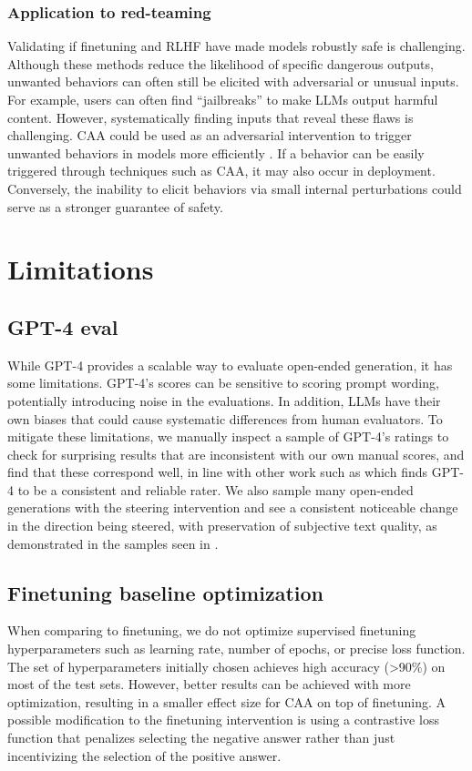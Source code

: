 \documentclass[11pt]{article}
\begin{document}
\subsubsection*{Application to red-teaming}
Validating if finetuning and RLHF have made models robustly safe is challenging. Although these methods reduce the likelihood of specific dangerous outputs, unwanted behaviors can often still be elicited with adversarial or unusual inputs. For example, users can often find ``jailbreaks'' to make LLMs output harmful content. However, systematically finding inputs that reveal these flaws is challenging. 
CAA could be used as an adversarial intervention to trigger unwanted behaviors in models more efficiently \citep{ninaredteaming}. If a behavior can be easily triggered through techniques such as CAA, it may also occur in deployment. Conversely, the inability to elicit behaviors via small internal perturbations could serve as a stronger guarantee of safety.

\clearpage

\section{Limitations}

\subsection*{GPT-4 eval}
While GPT-4 provides a scalable way to evaluate open-ended generation, it has some limitations. GPT-4's scores can be sensitive to scoring prompt wording, potentially introducing noise in the evaluations. In addition, LLMs have their own biases that could cause systematic differences from human evaluators. To mitigate these limitations, we manually inspect a sample of GPT-4's ratings to check for surprising results that are inconsistent with our own manual scores, and find that these correspond well, in line with other work such as \citet{Hackl_2023} which finds GPT-4 to be a consistent and reliable rater. We also sample many open-ended generations with the steering intervention and see a consistent noticeable change in the direction being steered, with preservation of subjective text quality, as demonstrated in the samples seen in .


\subsection*{Finetuning baseline optimization}
When comparing to finetuning, we do not optimize supervised finetuning hyperparameters such as learning rate, number of epochs, or precise loss function. The set of hyperparameters initially chosen achieves high accuracy (>90\%) on most of the test sets. However, better results can be achieved with more optimization, resulting in a smaller effect size for CAA on top of finetuning. A possible modification to the finetuning intervention is using a contrastive loss function that penalizes selecting the negative answer rather than just incentivizing the selection of the positive answer. 
\end{document}
